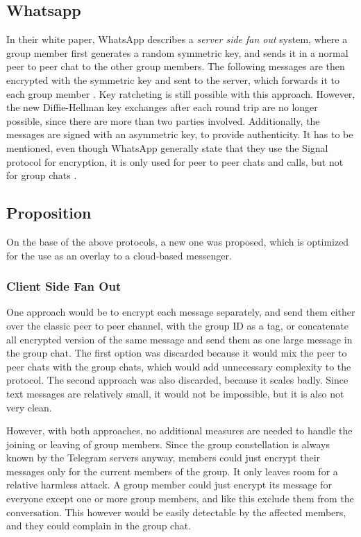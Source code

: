 \documentclass[a4paper, oneside]{discothesis}
\begin{document}
\subsection{Whatsapp}

In their white paper, WhatsApp describes a \emph{server side fan out} system, where a group member first generates a random symmetric key, and sends it in a normal peer to peer chat to the other group members. The following messages are then encrypted with the symmetric key and sent to the server, which forwards it to each group member \cite{Whatsapp}. Key ratcheting is still possible with this approach. However, the new Diffie-Hellman key exchanges after each round trip are no longer possible, since there are more than two parties involved. Additionally, the messages are signed with an asymmetric key, to provide authenticity. It has to be mentioned, even though WhatsApp generally state that they use the Signal protocol for encryption, it is only used for peer to peer chats and calls, but not for group chats \cite{Newbedev}.

\subsection{Proposition}
On the base of the above protocols, a new one was proposed, which is optimized for the use as an overlay to a cloud-based messenger.

\subsubsection{Client Side Fan Out}
\label{sec:server_side_fan_out}

One approach would be to encrypt each message separately, and send them either over the classic peer to peer channel, with the group ID as a tag, or concatenate all encrypted version of the same message and send them as one large message in the group chat. The first option was discarded because it would mix the peer to peer chats with the group chats, which would add unnecessary complexity to the protocol. The second approach was also discarded, because it scales badly. Since text messages are relatively small, it would not be impossible, but it is also not very clean.

However, with both approaches, no additional measures are needed to handle the joining or leaving of group members. Since the group constellation is always known by the Telegram servers anyway, members could just encrypt their messages only for the current members of the group. It only leaves room for a relative harmless attack. A group member could just encrypt its message for everyone except one or more group members, and like this exclude them from the conversation. This however would be easily detectable by the affected members, and they could complain in the group chat. 
\end{document}
